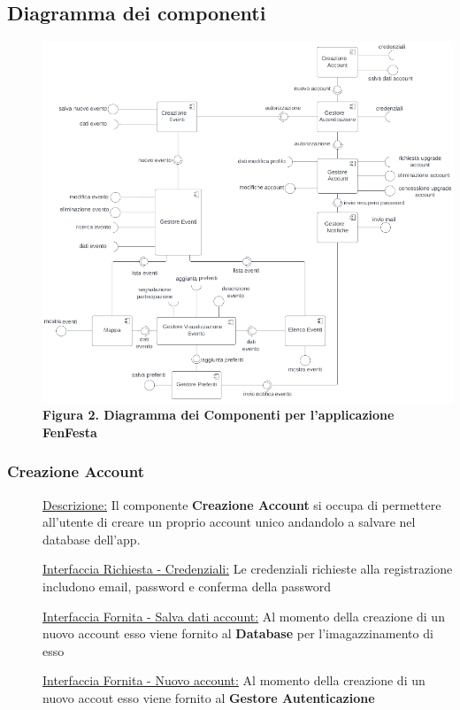 \documentclass{article}
\begin{document}
\subsection{Diagramma dei componenti}
\begin{description}
    \item[] \includegraphics[scale=0.6]{Component.png} \\
        \textbf{Figura 2. Diagramma dei Componenti per l'applicazione FenFesta} \label{fig:2}
\end{description}
\subsubsection{Creazione Account}
\begin{description}
    \item[] \underline{Descrizione:} Il componente \textbf{Creazione Account} si occupa di permettere all'utente di creare un proprio account unico andandolo a salvare nel database dell'app.
    \item[] \underline{Interfaccia Richiesta - Credenziali:} Le credenziali richieste alla registrazione includono email, password e conferma della password
    \item[] \underline{Interfaccia Fornita - Salva dati account:} Al momento della creazione di un nuovo account esso viene fornito al \textbf{Database} per l'imagazzinamento di esso
    \item[] \underline{Interfaccia Fornita - Nuovo account:} Al momento della creazione di un nuovo accout esso viene fornito al \textbf{Gestore Autenticazione}
\end{description}
\end{document}
